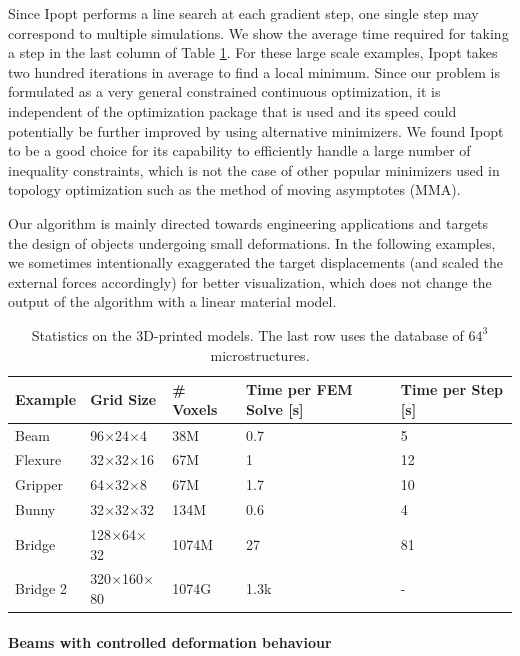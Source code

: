 	Since Ipopt performs a line search at each gradient step, one single step may correspond to multiple simulations. We show the average time required for taking a step in the last column of Table \ref{tab:results}. For these large scale examples, Ipopt takes two hundred iterations in average to find a local minimum. 
	Since our problem is formulated as a very general constrained continuous optimization, it is independent of the optimization package that is used and its speed could potentially be further improved by using alternative minimizers. 
	We found Ipopt to be a good choice for its capability to efficiently handle a large number of inequality constraints, which is not the case of other popular minimizers used in topology optimization such as the method of moving asymptotes (MMA).
	
	Our algorithm is mainly directed towards engineering applications and targets the design of objects undergoing small deformations. In the following examples, we sometimes intentionally exaggerated the target displacements (and scaled the external forces accordingly) for better visualization, which does not change the output of the algorithm with a linear material model.
	
	\begin{table}
		\centering
		\footnotesize
		\caption{Statistics on the 3D-printed models. The last row uses the database of $64^3$ microstructures.} 
		{
			\begin{tabularx}{\linewidth}{ |X| X | X | p{1cm}| p{1cm}| }
				\hline
				Example & Grid Size & \# Voxels & Time per FEM Solve [s] & Time per Step [s]\\ \hline
				Beam   & 96$\times$24$\times$4  & 38M  &  0.7 & 5\\
				Flexure & 32$\times$32$\times$16 & 67M  & 1 & 12\\
				Gripper   & 64$\times$32$\times$8  & 67M  & 1.7 & 10\\	\hline
				Bunny & 32$\times$32$\times$32 & 134M  & 0.6 & 4 \\
				Bridge & 128$\times$64$\times$32 & 1074M  & 27 & 81\\
				Bridge 2 & 320$\times$160$\times$80 & 1074G  & 1.3k & - \\
				\hline
			\end{tabularx} }
			\label{tab:results}
		\end{table}
		
		\paragraph*{Beams with controlled deformation behaviour}
		
